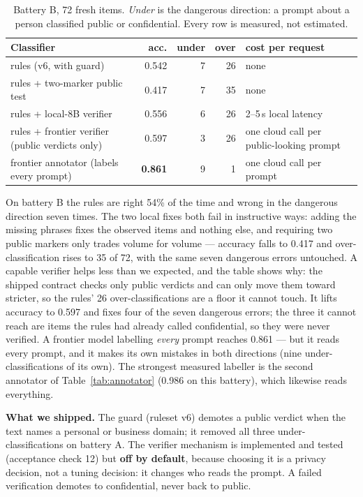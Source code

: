 \documentclass[11pt]{article}
\begin{document}
\begin{table}[h]
\centering
\small
\begin{tabular}{@{}lrrrp{}@{}}
\toprule
\textbf{Classifier} & \textbf{acc.} & \textbf{under} & \textbf{over} & \textbf{cost per request} \\
\midrule
rules (v6, with guard)            & 0.542 & 7  & 26 & none \\
rules + two-marker public test    & 0.417 & 7  & 35 & none \\
rules + local-8B verifier         & 0.556 & 6  & 26 & 2--5\,s local latency \\
rules + frontier verifier (public verdicts only) & 0.597 & 3 & 26 & one cloud call per public-looking prompt \\
frontier annotator (labels every prompt)         & \textbf{0.861} & 9 & 1 & one cloud call per prompt \\
\bottomrule
\end{tabular}
\caption{Battery B, 72 fresh items. \emph{Under} is the dangerous direction: a prompt about a person
classified public or confidential. Every row is measured, not estimated.}
\label{tab:classifier}
\end{table}

On battery B the rules are right 54\% of the time and wrong in the dangerous direction seven times.
The two local fixes both fail in instructive ways: adding the missing phrases fixes the observed
items and nothing else, and requiring two public markers only trades volume for volume ---
accuracy falls to 0.417 and over-classification rises to 35 of 72, with the same seven dangerous
errors untouched. A capable verifier helps less than we expected, and the table shows why: the
shipped contract checks only public verdicts and can only move them toward stricter, so the rules'
26 over-classifications are a floor it cannot touch. It lifts accuracy to 0.597 and fixes four of
the seven dangerous errors; the three it cannot reach are items the rules had already called
confidential, so they were never verified. A frontier model labelling \emph{every} prompt reaches
0.861 --- but it reads every prompt, and it makes its own mistakes in both directions (nine
under-classifications of its own). The strongest measured labeller is the second annotator of
Table~\ref{tab:annotator} (0.986 on this battery), which likewise reads everything.

\textbf{What we shipped.} The guard (ruleset v6) demotes a public verdict when the text names a
personal or business domain; it removed all three under-classifications on battery A. The verifier
mechanism is implemented and tested (acceptance check 12) but \textbf{off by default}, because
choosing it is a privacy decision, not a tuning decision: it changes who reads the prompt. A failed
verification demotes to confidential, never back to public.
\end{document}
